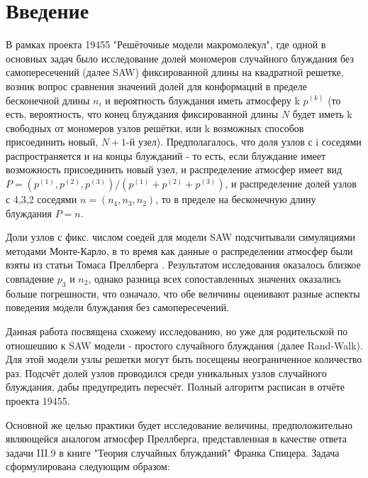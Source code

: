 \section{Введение}

В рамках проекта 19455 "Решёточные модели макромолекул", где одной в основных задач было исследование долей мономеров случайного блуждания без самопересечений (далее SAW) фиксированной длины на квадратной решетке, возник вопрос сравнения значений долей для конформаций в пределе бесконечной длины $n_i$ и вероятность блуждания иметь атмосферу k $p^{(k)}$ (то есть, вероятность, что конец блуждания фиксированной длины $N$ будет иметь k свободных от мономеров узлов решётки, или k возможных способов присоединить новый, $N+1$-й узел). 
Предполагалось, что доля узлов с i соседями распространяется и на концы блужданий - то есть, если блуждание имеет возможность присоединить новый узел, и распределение атмосфер имеет вид $ P = (p^{(1)},p^{(2)},p^{(3)}) / (p^{(1)}+p^{(2)}+p^{(3)})$, и распределение долей узлов с 4,3,2 соседями $n = (n_4, n_3, n_2)$, то в пределе на бесконечную длину блуждания $P = n$. 

Доли узлов с фикс. числом соедей для модели SAW подсчитывали симуляциями методами Монте-Карло, в то время как данные о распределении атмосфер были взяты из статьи Томаса Преллберга \cite{Spitser1969}.
Результатом исследования оказалось близкое совпадение $p_3$ и $n_2$, однако разница всех сопоставленных значених оказались больше погрешности, что означало, что обе величины оценивают разные аспекты поведения модели блуждания без самопересечений.

Данная работа посвящена схожему исследованию, но уже для родительской по отношешию к SAW модели - простого случайного блуждания (далее Rand-Walk). Для этой модели узлы решетки могут быть посещены неограниченное количество раз. Подсчёт долей узлов проводился среди уникальных узлов случайного блуждания, дабы предупредить пересчёт. Полный алгоритм расписан в отчёте проекта 19455.

Основной же целью практики будет исследование величины, предположительно являющейся аналогом атмосфер Преллберга, представленная в качестве ответа задачи III.9 в книге "Теория случайных блужданий" Франка Спицера. Задача сформулирована следующим образом: 

